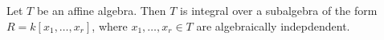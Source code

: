 Let $T$ be an affine algebra. Then $T$ is integral over a subalgebra of the form
$R = k[x_1, \ldots, x_r]$, where $x_1, \ldots, x_r \in T$ are algebraically
indepdendent.
